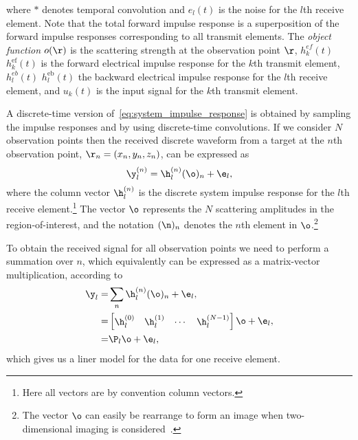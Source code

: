 where $*$ denotes temporal convolution and $e_l(t)$ is the noise for the $l$th receive element.
Note that the total forward impulse response is a superposition of the forward impulse responses
corresponding to all transmit elements. The \emph{object function}
$o(\r)$ is the scattering strength at the observation point $\r$,
{
  $h_{k}^{ef}(t)$
}{
  $h_{k}^\text{ef}(t)$
}
is the forward electrical impulse response for the $k$th transmit element,
{
  $h_{l}^{eb}(t)$
}{
  $h_{l}^\text{eb}(t)$
}
the backward electrical impulse response
for the $l$th receive element, and $u_k(t)$ is the input signal for the $k$th transmit element.

A discrete-time version of~\eqref{eq:system_impulse_response} is obtained by sampling the
impulse responses and by using discrete-time convolutions. If we consider $N$ observation points
then the received discrete waveform from a target at the $n$th observation point,
$\r_n = (x_n,y_n,z_n)$, can be expressed as
\begin{equation}
  \y_l^{(n)} = \h_l^{(n)}(\o)_{n} + \e_l,
  \label{eq:one-pt}
\end{equation}
where the column vector $\h_l^{(n)}$ is the discrete system impulse response for
the $l$th receive element.\footnote{Here all vectors are by convention column vectors.} The vector $\o$
represents the $N$ scattering amplitudes in the region-of-interest, and the notation $(\n)_{n}$ denotes the $n$th
element in $\o$.\footnote{The vector $\o$ can easily be rearrange to form an image when two-dimensional imaging is
  considered~\cite{Lingvall2004}.}

To obtain the received signal for all observation points we need to perform a summation over $n$, which
equivalently can be expressed as a matrix-vector multiplication, according to
\begin{equation}
  \begin{split}
  \y_l = & \sum_{n}\h_l^{(n)}(\o)_{n} + \e_l,\\
  = &\begin{bmatrix} \h_l^{(0)} &  \h_l^{(1)} & \cdots & \h_l^{(N-1)} \end{bmatrix}\o + \e_l,\\
  = & \P_l\o + \e_l,\\
  \end{split}
  \label{eq:all-pts}
\end{equation}
which gives us a liner model for the data for one receive element.

